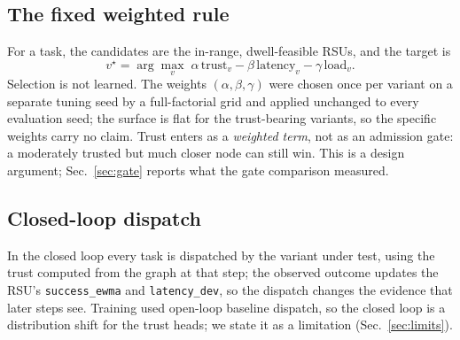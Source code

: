 \subsection{The fixed weighted rule}
\label{sec:rule}
For a task, the candidates are the in-range, dwell-feasible RSUs, and the target is
\begin{equation}
v^\star=\arg\max_v\;\alpha\,\text{trust}_v-\beta\,\text{latency}_v-\gamma\,\text{load}_v .
\end{equation}
Selection is not learned.
The weights $(\alpha,\beta,\gamma)$ were chosen once per variant on a separate tuning seed by a full-factorial grid and applied unchanged to every evaluation seed; the surface is flat for the trust-bearing variants, so the specific weights carry no claim.
Trust enters as a \emph{weighted term}, not as an admission gate: a moderately trusted but much closer node can still win.
This is a design argument; Sec.~\ref{sec:gate} reports what the gate comparison measured.

\subsection{Closed-loop dispatch}
In the closed loop every task is dispatched by the variant under test, using the trust computed from the graph at that step; the observed outcome updates the RSU's \texttt{success\_ewma} and \texttt{latency\_dev}, so the dispatch changes the evidence that later steps see.
Training used open-loop baseline dispatch, so the closed loop is a distribution shift for the trust heads; we state it as a limitation (Sec.~\ref{sec:limits}).

